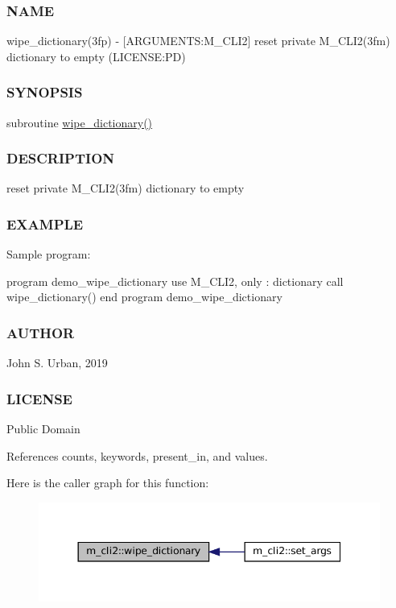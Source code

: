 \subsubsection*{N\+A\+ME}

wipe\+\_\+dictionary(3fp) -\/ \mbox{[}A\+R\+G\+U\+M\+E\+N\+TS\+:M\+\_\+\+C\+L\+I2\mbox{]} reset private M\+\_\+\+C\+L\+I2(3fm) dictionary to empty (L\+I\+C\+E\+N\+SE\+:PD) \subsubsection*{S\+Y\+N\+O\+P\+S\+IS}

subroutine \mbox{\hyperlink{namespacem__cli2_ab1525b0419475486f520ef502daa5e94}{wipe\+\_\+dictionary()}} \subsubsection*{D\+E\+S\+C\+R\+I\+P\+T\+I\+ON}

reset private M\+\_\+\+C\+L\+I2(3fm) dictionary to empty \subsubsection*{E\+X\+A\+M\+P\+LE}

Sample program\+: \begin{DoxyVerb} program demo_wipe_dictionary
 use M_CLI2, only : dictionary
    call wipe_dictionary()
 end program demo_wipe_dictionary
\end{DoxyVerb}
 \subsubsection*{A\+U\+T\+H\+OR}

John S. Urban, 2019 \subsubsection*{L\+I\+C\+E\+N\+SE}

Public Domain 

References counts, keywords, present\+\_\+in, and values.

Here is the caller graph for this function\+:
\nopagebreak
\begin{figure}[H]
\begin{center}
\leavevmode
\includegraphics[width=344pt]{namespacem__cli2_ab1525b0419475486f520ef502daa5e94_icgraph}
\end{center}
\end{figure}


